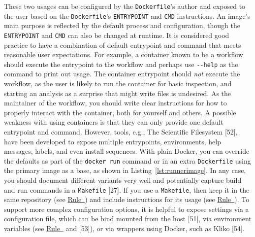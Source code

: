 \documentclass[10pt,letterpaper]{article}
\begin{document}
These two usages can be configured by the \texttt{Dockerfile}'s author
and exposed to the user based on the \texttt{Dockerfile}'s
\texttt{ENTRYPOINT} and \texttt{CMD} instructions. An image's main
purpose is reflected by the default process and configuration, though
the \texttt{ENTRYPOINT} and \texttt{CMD} can also be changed at runtime.
It is considered good practice to have a combination of default
entrypoint and command that meets reasonable user expectations. For
example, a container known to be a workflow should execute the
entrypoint to the workflow and perhaps use \texttt{-\/-help} as the
command to print out usage. The container entrypoint should \emph{not}
execute the workflow, as the user is likely to run the container for
basic inspection, and starting an analysis as a surprise that might
write files is undesired. As the maintainer of the workflow, you should
write clear instructions for how to properly interact with the
container, both for yourself and others. A possible weakness with using
containers is that they can only provide one default entrypoint and
command. However, tools, e.g., The Scientific Filesystem {[}52{]}, have
been developed to expose multiple entrypoints, environments, help
messages, labels, and even install sequences. With plain Docker, you can
override the defaults as part of the \texttt{docker\ run} command or in
an extra \texttt{Dockerfile} using the primary image as a base, as shown
in Listing~\ref{lst:runnerimage}. In any case, you should document
different variants very well and potentially capture build and run
commands in a \texttt{Makefile} {[}27{]}. If you use a
\texttt{Makefile}, then keep it in the same repository (see
\hyperref[{rule:mount}]{Rule~}) and include
instructions for its usage (see
\hyperref[{rule:document}]{Rule~}). To support
more complex configuration options, it is helpful to expose settings via
a configuration file, which can be bind mounted from the host {[}51{]},
via environment variables (see
\hyperref[{rule:document}]{Rule~} and
{[}53{]}), or via wrappers using Docker, such as Kliko {[}54{]}.

\scriptsize
\end{document}
